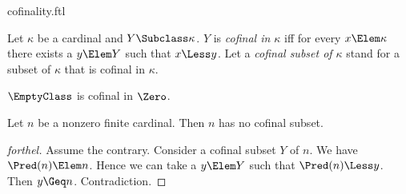 \documentclass{stex}
\begin{document}
\begin{smodule}{cofinality.ftl}



\begin{definition*}[forthel,for={cofinal,cofinal subset}]
  Let $\kappa$ be a cardinal and $Y \Subclass \kappa$.
  $Y$ is \emph{cofinal in $\kappa$} iff for every $x \Elem \kappa$ there exists a $y \Elem Y$ such that $x \Less y$.
  Let a \emph{cofinal subset of $\kappa$} stand for a subset of $\kappa$ that is cofinal in $\kappa$.
\end{definition*}

\begin{proposition*}[forthel]
  $\EmptyClass$ is cofinal in $\Zero$.
\end{proposition*}

\begin{proposition*}[forthel]
  Let $n$ be a nonzero finite cardinal.
  Then $n$ has no cofinal subset.
\end{proposition*}
\begin{proof}[forthel]
  Assume the contrary.
  Consider a cofinal subset $Y$ of $n$.
  We have $\Pred(n) \Elem n$.
  Hence we can take a $y \Elem Y$ such that $\Pred(n) \Less y$.
  Then $y \Geq n$.
  Contradiction.
\end{proof}

\end{smodule}
\end{document}
